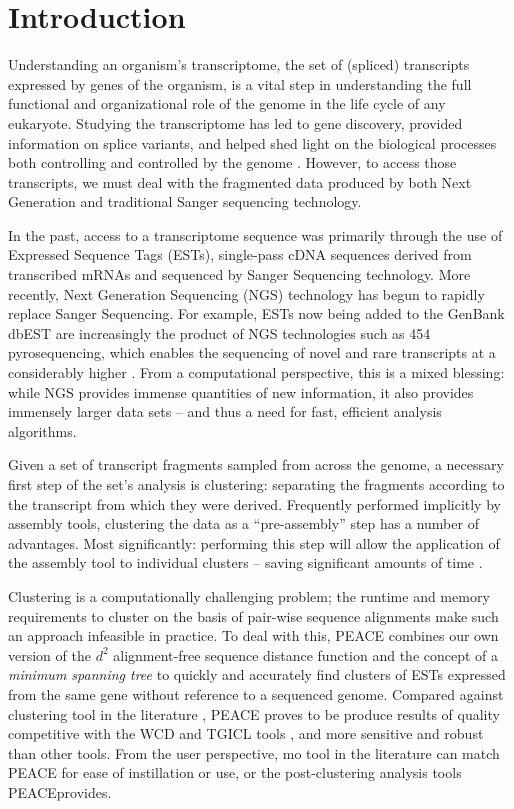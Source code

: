 \documentclass[a4,center,fleqn]{NAR}
\newcommand{\peace} {{\small PEACE}}
\newcommand{\wcd} {{\small WCD}}
\newcommand{\tgicl} {{\small TGICL}}
\begin{document}
\section{Introduction}

Understanding an organism's transcriptome, the set of (spliced)
transcripts expressed by genes of the organism, is a vital step in
understanding the full functional and organizational role of the
genome in the life cycle of any eukaryote.  Studying the transcriptome
has led to gene discovery, provided information on splice variants,  
and helped shed light on the biological processes both controlling and
controlled by the genome \cite{Nagaraj07}.  However, to access those
transcripts, we must deal with the fragmented data produced by
both Next Generation and traditional Sanger sequencing technology.

In the past, access to a transcriptome sequence was primarily through
the use of Expressed Sequence Tags (ESTs), single-pass cDNA sequences
derived from transcribed mRNAs and sequenced by Sanger Sequencing
technology.  More recently, Next Generation Sequencing (NGS)
technology has begun to rapidly replace Sanger Sequencing.  For
example, ESTs now being added to the GenBank dbEST are increasingly
the product of NGS technologies such as 454 pyrosequencing, which
enables the sequencing of novel and rare transcripts at a considerably
higher \cite{Cheung2006,Emrich2007}.  From a computational perspective, this
is a mixed blessing: while NGS provides immense quantities of new
information, it also provides immensely larger data sets -- and thus a
need for fast, efficient analysis algorithms.

\enlargethispage{-65.1pt}

Given a set of transcript fragments sampled from across the genome, a
necessary first step of the set's analysis is clustering: separating
the fragments according to the transcript from which they were
derived.  Frequently performed implicitly by assembly tools,
clustering the data as a ``pre-assembly'' step has a number of
advantages.  Most significantly: performing this step will
allow the application of the assembly tool to individual clusters --
saving significant amounts of time \cite{Hazelhurst08a}.  

Clustering is a computationally challenging problem; the runtime and
memory requirements to cluster on the basis of pair-wise sequence
alignments make such an approach infeasible in practice.  To deal with
this, \peace\/ combines our own version of the $d^2$ alignment-free
sequence distance function \cite{Hide94} and the concept of a {\it
  minimum spanning tree} \cite{Prim57} to quickly and accurately find
clusters of ESTs expressed from the same gene without reference to a
sequenced genome.  Compared against clustering tool in the literature
\cite{Burke99,Slater00,Huang99,Parkinson02,Kalyanaraman03,Malde03,
  Pertea2003,Ptitsyn05,Hazelhurst08a,Picardi09}, \peace\/ proves to be
produce results of quality competitive with the \wcd\/ and \tgicl\/ tools
\cite{Hazelhurst08a,Pertea2003}, and more sensitive and robust than
other tools.  From the user perspective, mo tool in the literature can
match \peace\/ for ease of instillation or use, or the post-clustering
analysis tools \peace provides.
\end{document}
